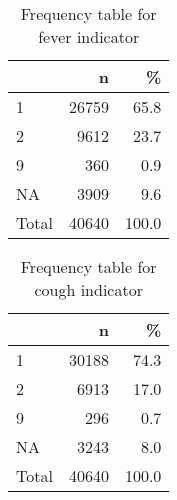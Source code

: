 \documentclass[
]{article}
\newenvironment{Shaded}{\begin{snugshade}}{\end{snugshade}}
\newcommand{\DataTypeTok}[1]{\textcolor[rgb]{0.13,0.29,0.53}{#1}}
\newcommand{\DecValTok}[1]{\textcolor[rgb]{0.00,0.00,0.81}{#1}}
\newcommand{\KeywordTok}[1]{\textcolor[rgb]{0.13,0.29,0.53}{\textbf{#1}}}
\newcommand{\NormalTok}[1]{#1}
\newcommand{\OperatorTok}[1]{\textcolor[rgb]{0.81,0.36,0.00}{\textbf{#1}}}
\newcommand{\OtherTok}[1]{\textcolor[rgb]{0.56,0.35,0.01}{#1}}
\newcommand{\StringTok}[1]{\textcolor[rgb]{0.31,0.60,0.02}{#1}}
\begin{document}
\begin{table}[!h]

\caption{\label{tab:unnamed-chunk-49}Frequency table for fever indicator}
\centering
\begin{tabular}[t]{l|r|r}
\hline
  & n & \%\\
\hline
1 & 26759 & 65.8\\
\hline
2 & 9612 & 23.7\\
\hline
9 & 360 & 0.9\\
\hline
NA & 3909 & 9.6\\
\hline
Total & 40640 & 100.0\\
\hline
\end{tabular}
\end{table}

\begin{Shaded}
\end{Shaded}

\begin{table}[!h]

\caption{\label{tab:unnamed-chunk-50}Frequency table for cough indicator}
\centering
\begin{tabular}[t]{l|r|r}
\hline
  & n & \%\\
\hline
1 & 30188 & 74.3\\
\hline
2 & 6913 & 17.0\\
\hline
9 & 296 & 0.7\\
\hline
NA & 3243 & 8.0\\
\hline
Total & 40640 & 100.0\\
\hline
\end{tabular}
\end{table}
\end{document}
